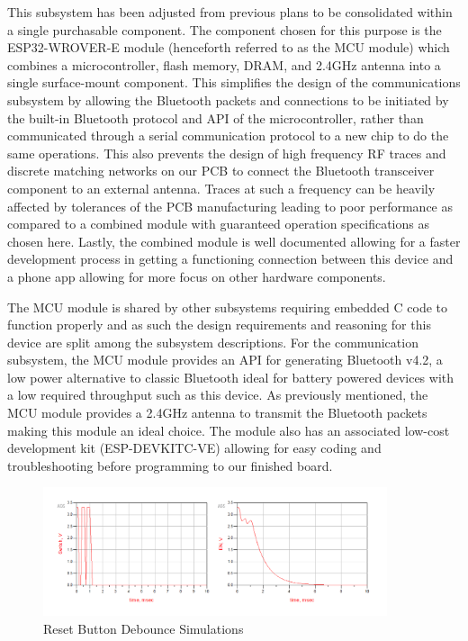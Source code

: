 \documentclass[12pt]{article}
\begin{document}
This subsystem has been adjusted from previous plans to be consolidated within a single purchasable component. The component chosen for this purpose is the ESP32-WROVER-E module (henceforth referred to as the MCU module) which combines a microcontroller, flash memory, DRAM, and 2.4GHz antenna into a single surface-mount component. This simplifies the design of the communications subsystem by allowing the Bluetooth packets and connections to be initiated by the built-in Bluetooth protocol and API of the microcontroller, rather than communicated through a serial communication protocol to a new chip to do the same operations. This also prevents the design of high frequency RF traces and discrete matching networks on our PCB to connect the Bluetooth transceiver component to an external antenna. Traces at such a frequency can be heavily affected by tolerances of the PCB manufacturing leading to poor performance as compared to a combined module with guaranteed operation specifications as chosen here. Lastly, the combined module is well documented allowing for a faster development process in getting a functioning connection between this device and a phone app allowing for more focus on other hardware components.

The MCU module is shared by other subsystems requiring embedded C code to function properly and as such the design requirements and reasoning for this device are split among the subsystem descriptions. For the communication subsystem, the MCU module provides an API for generating Bluetooth v4.2, a low power alternative to classic Bluetooth ideal for battery powered devices with a low required throughput such as this device. As previously mentioned, the MCU module provides a 2.4GHz antenna to transmit the Bluetooth packets making this module an ideal choice. The module also has an associated low-cost development kit (ESP-DEVKITC-VE) allowing for easy coding and troubleshooting before programming to our finished board.

\begin{figure}[!h]
	\centering
	\includegraphics[width=0.9\textwidth]{reset_debounce.png}
	\caption{Reset Button Debounce Simulations}
	\label{fig:reset_debounce}
\end{figure}
\end{document}
